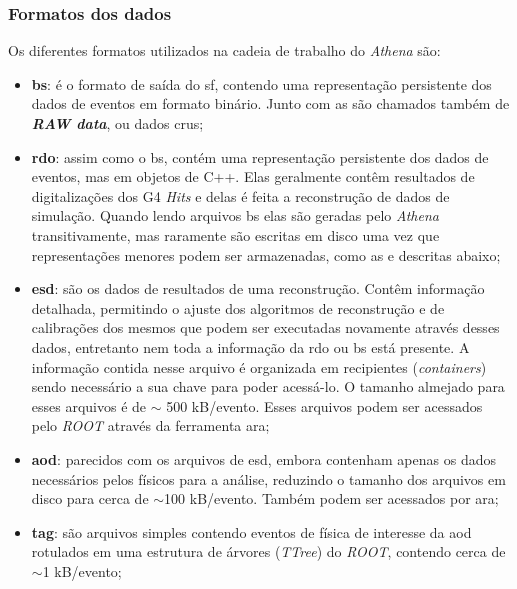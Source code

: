 \subsubsection{Formatos dos dados}
\label{sssec:athena_dados}

Os diferentes formatos \cite{atlaswb} utilizados na cadeia de trabalho do \emph{Athena}
são:

\begin{itemize}
\item \textbf{\gls{bs}}: é o formato de saída do \glsdesc{sf}, contendo
uma representação persistente dos dados de eventos em formato
binário. Junto com as  são chamados também de \textbf{\emph{RAW
data}}, ou dados crus;
\item \textbf{\gls{rdo}}: assim como o \gls{bs}, contém uma representação persistente 
dos dados de eventos, mas em objetos de C++. Elas geralmente contêm resultados
de digitalizações dos G4 \emph{Hits} e delas é feita a reconstrução de dados de
simulação. Quando lendo arquivos \gls{bs} elas são geradas pelo \emph{Athena}
transitivamente, mas raramente são escritas em disco uma vez que representações
menores podem ser armazenadas, como as  e 
descritas abaixo;
\item \textbf{\gls{esd}}: são os dados de resultados de uma reconstrução. Contêm
informação detalhada, permitindo o ajuste dos algoritmos de reconstrução e
de calibrações dos mesmos que podem ser executadas novamente através desses dados, entretanto
nem toda a informação da \gls{rdo} ou \gls{bs} está presente. A
informação contida nesse arquivo é organizada em recipientes (\emph{containers})
sendo necessário a sua chave para poder acessá-lo. O tamanho almejado para esses
arquivos é de $\sim$ 500 kB/evento. Esses arquivos podem ser acessados pelo \emph{ROOT}
através da ferramenta \gls{ara};
\item \textbf{\gls{aod}}: parecidos com os arquivos de \gls{esd}, embora contenham
apenas os dados necessários pelos físicos para a análise, reduzindo o
tamanho dos arquivos em disco para cerca de $\sim$100 kB/evento. Também podem ser
acessados por \gls{ara};
\item \textbf{\gls{tag}}: são arquivos simples contendo eventos de física de
interesse da \gls{aod} rotulados em uma estrutura de árvores (\emph{TTree}) 
do \emph{ROOT}, contendo cerca de $\sim$1 kB/evento;
\end{itemize}


